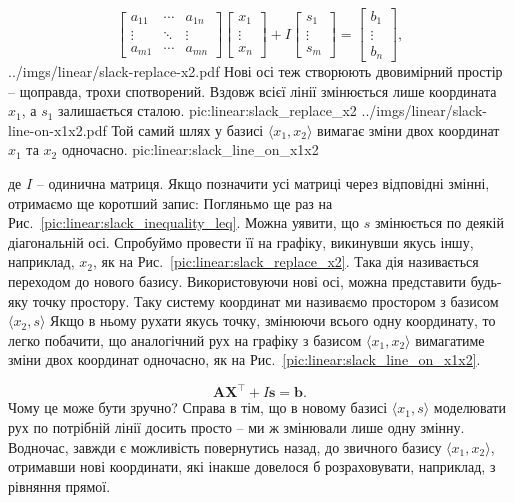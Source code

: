 \documentclass[\main/book.tex]{subfiles}
\begin{document}
$$
 \left[
 \begin{array}{ccc}
  a_{11} & \cdots & a_{1n} \\
  \vdots & \ddots & \vdots \\
  a_{m1} & \cdots & a_{mn}
 \end{array}
 \right]
 \left[
 \begin{array}{c}
  x_1 \\ \vdots \\ x_n
 \end{array}
 \right] +
 I \left[
 \begin{array}{c}
  s_1 \\ \vdots \\ s_m
 \end{array}
 \right] =
 \left[
 \begin{array}{c}
  b_1 \\ \vdots \\ b_n
 \end{array}
 \right],
$$
\twocolminipage
 {
  \nofigillustration
   {../imgs/linear/slack-replace-x2.pdf}
   {Нові осі теж створюють двовимірний простір -- щоправда, трохи \flqq{}спотворений\frqq. Вздовж всієї лінії змінюється лише координата $x_1$, а $s_1$ залишається сталою.}
   {pic:linear:slack_replace_x2}
 }{
  \nofigillustration
   {../imgs/linear/slack-line-on-x1x2.pdf}
   {Той самий шлях у базисі ${\langle x_1, x_2 \rangle}$ вимагає зміни двох координат $x_1$ та $x_2$ одночасно.}
   {pic:linear:slack_line_on_x1x2}
 }

де $I$ -- одинична матриця. Якщо позначити усі матриці через відповідні змінні, отримаємо ще коротший запис:
Погляньмо ще раз на Рис.~\ref{pic:linear:slack_inequality_leq}. Можна уявити, що $s$ змінюється по деякій діагональній осі. Спробуймо провести її на графіку, викинувши якусь іншу, наприклад, $x_2$, як на Рис.~\ref{pic:linear:slack_replace_x2}. Така дія називається \flqq{}переходом до нового базису\frqq. Використовуючи нові осі, можна представити будь-яку точку простору. Таку систему координат ми називаємо \flqq{}простором з базисом ${\langle x_2, s \rangle}$\frqq{} Якщо в ньому рухати якусь точку, змінюючи всього одну координату, то легко побачити, що аналогічний рух на графіку з базисом ${\langle x_1, x_2 \rangle}$ вимагатиме зміни двох координат одночасно, як на Рис.~\ref{pic:linear:slack_line_on_x1x2}.

$$
\mathbf{A}\mathbf{X}^\top + I \mathbf{s} = \mathbf{b}.
$$
Чому це може бути зручно? Справа в тім, що в новому базисі ${\langle x_1, s \rangle}$ моделювати рух по потрібній лінії досить просто -- ми ж змінювали лише одну змінну. Водночас, завжди є можливість повернутись назад, до звичного базису ${\langle x_1, x_2 \rangle}$, отримавши нові координати, які інакше довелося б розраховувати, наприклад, з рівняння прямої.
\end{document}
